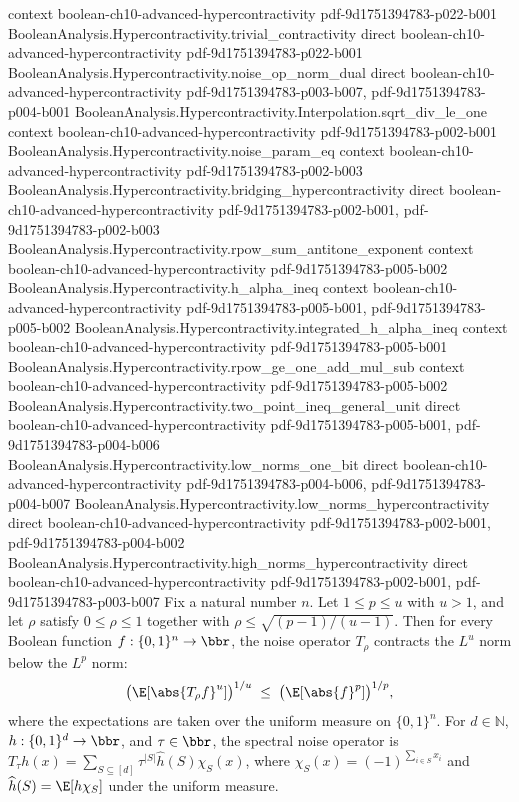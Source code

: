 \begin{theorem}
  {context}
  {boolean-ch10-advanced-hypercontractivity}
  {pdf-9d1751394783-p022-b001}
\proofstep
  {BooleanAnalysis.Hypercontractivity.trivial_contractivity}
  {direct}
  {boolean-ch10-advanced-hypercontractivity}
  {pdf-9d1751394783-p022-b001}
\proofstep
  {BooleanAnalysis.Hypercontractivity.noise_op_norm_dual}
  {direct}
  {boolean-ch10-advanced-hypercontractivity}
  {pdf-9d1751394783-p003-b007,
    pdf-9d1751394783-p004-b001}
\proofstep
  {BooleanAnalysis.Hypercontractivity.Interpolation.sqrt_div_le_one}
  {context}
  {boolean-ch10-advanced-hypercontractivity}
  {pdf-9d1751394783-p002-b001}
\proofstep
  {BooleanAnalysis.Hypercontractivity.noise_param_eq}
  {context}
  {boolean-ch10-advanced-hypercontractivity}
  {pdf-9d1751394783-p002-b003}
\proofstep
  {BooleanAnalysis.Hypercontractivity.bridging_hypercontractivity}
  {direct}
  {boolean-ch10-advanced-hypercontractivity}
  {pdf-9d1751394783-p002-b001,
    pdf-9d1751394783-p002-b003}
\proofstep
  {BooleanAnalysis.Hypercontractivity.rpow_sum_antitone_exponent}
  {context}
  {boolean-ch10-advanced-hypercontractivity}
  {pdf-9d1751394783-p005-b002}
\proofstep
  {BooleanAnalysis.Hypercontractivity.h_alpha_ineq}
  {context}
  {boolean-ch10-advanced-hypercontractivity}
  {pdf-9d1751394783-p005-b001,
    pdf-9d1751394783-p005-b002}
\proofstep
  {BooleanAnalysis.Hypercontractivity.integrated_h_alpha_ineq}
  {context}
  {boolean-ch10-advanced-hypercontractivity}
  {pdf-9d1751394783-p005-b001}
\proofstep
  {BooleanAnalysis.Hypercontractivity.rpow_ge_one_add_mul_sub}
  {context}
  {boolean-ch10-advanced-hypercontractivity}
  {pdf-9d1751394783-p005-b002}
\proofstep
  {BooleanAnalysis.Hypercontractivity.two_point_ineq_general_unit}
  {direct}
  {boolean-ch10-advanced-hypercontractivity}
  {pdf-9d1751394783-p005-b001,
    pdf-9d1751394783-p004-b006}
\proofstep
  {BooleanAnalysis.Hypercontractivity.low_norms_one_bit}
  {direct}
  {boolean-ch10-advanced-hypercontractivity}
  {pdf-9d1751394783-p004-b006,
    pdf-9d1751394783-p004-b007}
\proofstep
  {BooleanAnalysis.Hypercontractivity.low_norms_hypercontractivity}
  {direct}
  {boolean-ch10-advanced-hypercontractivity}
  {pdf-9d1751394783-p002-b001,
    pdf-9d1751394783-p004-b002}
\proofstep
  {BooleanAnalysis.Hypercontractivity.high_norms_hypercontractivity}
  {direct}
  {boolean-ch10-advanced-hypercontractivity}
  {pdf-9d1751394783-p002-b001,
    pdf-9d1751394783-p003-b007}
Fix a natural number $n$. Let $1 \le p \le u$ with $u > 1$, and let $\rho$ satisfy $0
\le \rho \le 1$ together
with $\rho \le \sqrt{(p-1)/(u-1)}$. Then for every Boolean function $f:\{0,1\}^n \to
\bbr$, the noise operator $T_\rho$ contracts the $L^u$ norm below the $L^p$ norm:
\[
\bigl(\E\!\left[\abs{T_\rho f}^u\right]\bigr)^{1/u} \;\le\;
\bigl(\E\!\left[\abs{f}^p\right]\bigr)^{1/p},
\]
where the expectations are taken over the uniform measure on $\{0,1\}^n$. For
$d\in\mathbb N$, $h:\{0,1\}^d\to\bbr$, and $\tau\in\bbr$, the spectral noise operator is
$T_\tau h(x)=\sum_{S\subseteq[d]}\tau^{|S|}\widehat h(S)\chi_S(x)$, where
$\chi_S(x)=(-1)^{\sum_{i\in S}x_i}$ and $\widehat h(S)=\E[h\chi_S]$ under the uniform
measure.
\end{theorem}

